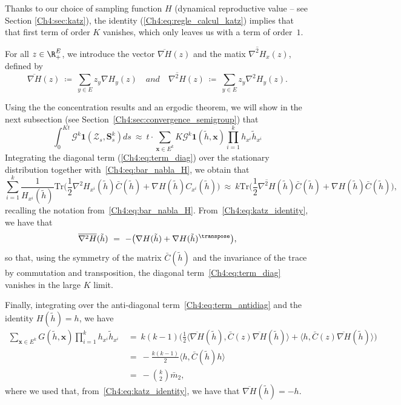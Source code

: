 \begin{refsegment}
Thanks to our choice of sampling function $H$ (dynamical reproductive value -- see Section \ref{Ch4:sec:katz}),  the identity (\ref{Ch4:eq:regle_calcul_katz}) implies that that first term of order $K$ vanishes, 
which only leaves us with a term of order~$1$.


For all $z\in \R_+^E$, we introduce the vector $\overline{\nabla H}(z)$ and the matix $\overline{\nabla^2 H}_x(z)$, defined by
\begin{equation}\label{Ch4:eq:bar_nabla_H}
\overline{\nabla H}(z)\ \coloneqq\ \sum_{y \in E} z_y \nabla H_{y}(z)\quad\textit{and}\quad \overline{\nabla^2 H}(z)\ \coloneqq\ \sum_{y \in E} z_y \nabla^2 H_y(z).
\end{equation}

Using the the concentration results and an ergodic theorem, we will show in the next subsection (see Section~\ref{Ch4:sec:convergence_semigroup}) that  
\[ \int_0^{Kt}\mathcal{G}^k\bm{1}(\mathcal Z_s,\bm S^k_{s})ds \ \approx\ t\cdot \sum_{\bm x\in E^k}K\mathcal{G}^k\bm{1}(\tilde h, \bm x)\prod_{i=1}^k h_{x^i}\tilde h_{x^i}\]
Integrating the diagonal term (\ref{Ch4:eq:term_diag}) over the stationary distribution together with~\eqref{Ch4:eq:bar_nabla_H}, we obtain that
\[
 \sum_{i=1}^k\frac{1}{H_{x^i}(\tilde h)}\mathrm{Tr}\Big(
  \frac{1}{2} \nabla^2 H_{x^i}(\tilde h) \bar C(\tilde h)
  +  \nabla H(\tilde h)  C_{x^i}(\tilde h)\Big)\ \approx\ k \mathrm{Tr}\Big(\frac{1}{2} \overline{\nabla^2 H}(\tilde h) \bar C(\tilde h)
  +  \nabla H(\tilde h)\bar C(\tilde h)\Big),
\]
recalling the notation from~\eqref{Ch4:eq:bar_nabla_H}.
From~\eqref{Ch4:eq:katz_identity}, we have that 
\[
\overline{\nabla^2 H}(\tilde h) \ =\ -\big(\nabla H(\tilde h)+ \nabla H(\tilde h)^{\transpose}\big),
\]
so that, using the symmetry of the matrix $\bar C(\tilde h)$ and the invariance of the trace by commutation and transposition, the diagonal term~\eqref{Ch4:eq:term_diag} vanishes in the large $K$ limit.

Finally,
integrating over the anti-diagonal term~\eqref{Ch4:eq:term_antidiag} and
the identity $H(\tilde h)=h$,  
we have
\begin{align*}
 \sum_{\bm x\in E^k}G(\tilde h, \bm x)\prod_{i=1}^k h_{x^i}\tilde h_{x^i}\
 &=\  k(k-1)\Big( \frac{1}{2} \big\langle \overline{\nabla H}(\tilde h), \bar C(z) \overline{\nabla H}(\tilde h)\big\rangle + \big\langle h, \bar C(z) \overline{\nabla H}(\tilde h)\big\rangle\Big)\\
&=\ -\frac{k(k-1)}{2}\big\langle  h,  \bar C(\tilde h) h\big\rangle \\
& =\ -\binom{k}{2}\bar m_2,
\end{align*}
where we used that, from~\eqref{Ch4:eq:katz_identity}, we have that $\overline{\nabla H}(\tilde h) = - h$.



\end{refsegment}
